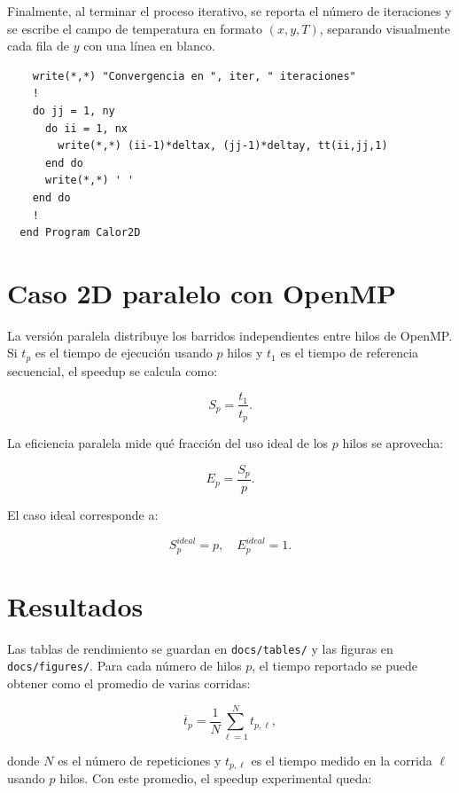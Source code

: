 \documentclass[11pt,a4paper]{article}
\begin{document}
  Finalmente, al terminar el proceso iterativo, se reporta el n\'umero de
  iteraciones y se escribe el campo de temperatura en formato
  \((x,y,T)\), separando visualmente cada fila de \(y\) con una l\'inea en blanco.

  \begin{verbatim}
    write(*,*) "Convergencia en ", iter, " iteraciones"
    !
    do jj = 1, ny
      do ii = 1, nx
        write(*,*) (ii-1)*deltax, (jj-1)*deltay, tt(ii,jj,1)
      end do
      write(*,*) ' '
    end do
    !
  end Program Calor2D
  \end{verbatim}

\section{Caso 2D paralelo con OpenMP} 
La versi\'on paralela distribuye los barridos independientes entre hilos de
OpenMP. Si $t_p$ es el tiempo de ejecuci\'on usando $p$ hilos y $t_1$ es el
tiempo de referencia secuencial, el speedup se calcula como:

\begin{equation}
S_p=\frac{t_1}{t_p}.
\end{equation}

La eficiencia paralela mide qu\'e fracci\'on del uso ideal de los $p$ hilos se
aprovecha:

\begin{equation}
E_p=\frac{S_p}{p}.
\end{equation}

El caso ideal corresponde a:

\begin{equation}
S_p^{ideal}=p,
\quad
E_p^{ideal}=1.
\end{equation}

\section{Resultados}

Las tablas de rendimiento se guardan en \texttt{docs/tables/} y las figuras en
\texttt{docs/figures/}. Para cada n\'umero de hilos $p$, el tiempo reportado se
puede obtener como el promedio de varias corridas:

\begin{equation}
\overline{t}_p=\frac{1}{N}\sum_{\ell=1}^{N}t_{p,\ell},
\end{equation}

donde $N$ es el n\'umero de repeticiones y $t_{p,\ell}$ es el tiempo medido en
la corrida $\ell$ usando $p$ hilos. Con este promedio, el speedup experimental
queda:
\end{document}
